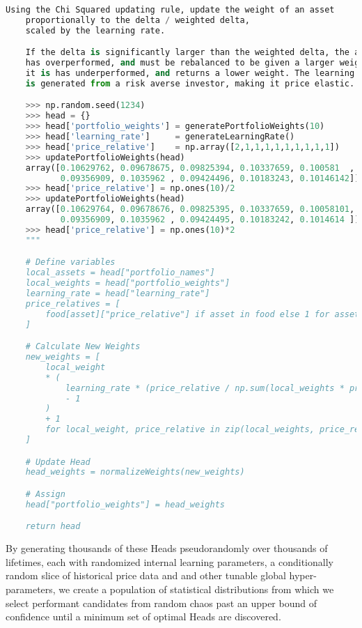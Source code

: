 \documentclass[11pt, a4paper]{awesome-cv}
\begin{document}
\begin{cvletter}
\begin{lstlisting}[language=Python]
    Using the Chi Squared updating rule, update the weight of an asset
    proportionally to the delta / weighted delta,
    scaled by the learning rate.

    If the delta is significantly larger than the weighted delta, the asset
    has overperformed, and must be rebalanced to be given a larger weight. If not,
    it is has underperformed, and returns a lower weight. The learning rate
    is generated from a risk averse investor, making it price elastic.

    >>> np.random.seed(1234)
    >>> head = {}
    >>> head['portfolio_weights'] = generatePortfolioWeights(10)
    >>> head['learning_rate']     = generateLearningRate()
    >>> head['price_relative']    = np.array([2,1,1,1,1,1,1,1,1,1])          # Black Swan Market [2, 1, ... , 1]   => Buy 0
    >>> updatePortfolioWeights(head)
    array([0.10629762, 0.09678675, 0.09825394, 0.10337659, 0.100581  ,
           0.09356909, 0.1035962 , 0.09424496, 0.10183243, 0.10146142])
    >>> head['price_relative'] = np.ones(10)/2                               # Bear Market [0.5, ...]              => No change
    >>> updatePortfolioWeights(head)
    array([0.10629764, 0.09678676, 0.09825395, 0.10337659, 0.10058101,
           0.09356909, 0.1035962 , 0.09424495, 0.10183242, 0.1014614 ])
    >>> head['price_relative'] = np.ones(10)*2                               # Bull Market [2, ...]                => No change
    """

    # Define variables
    local_assets = head["portfolio_names"]
    local_weights = head["portfolio_weights"]
    learning_rate = head["learning_rate"]
    price_relatives = [
        food[asset]["price_relative"] if asset in food else 1 for asset in local_assets
    ]

    # Calculate New Weights
    new_weights = [
        local_weight
        * (
            learning_rate * (price_relative / np.sum(local_weights * price_relatives))
            - 1
        )
        + 1
        for local_weight, price_relative in zip(local_weights, price_relatives)
    ]

    # Update Head
    head_weights = normalizeWeights(new_weights)

    # Assign
    head["portfolio_weights"] = head_weights

    return head
\end{lstlisting}

By generating thousands of these Heads pseudorandomly over thousands of
lifetimes, each with randomized internal learning parameters, a conditionally
random slice of historical price data and and other tunable global
hyper-parameters, we create a population of statistical distributions from which
we select performant candidates from random chaos past an upper bound of
confidence until a minimum set of optimal Heads are discovered.


\end{cvletter}
\end{document}
